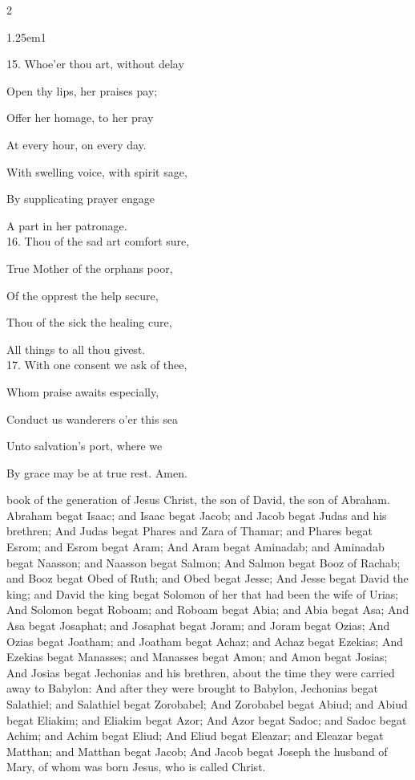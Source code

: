 \begin{multicols}{2}
\begin{hangparas}{1.25em}{1}

15. Whoe'er thou art, without delay

Open thy lips, her praises pay;

Offer her homage, to her pray

At every hour, on every day.

With swelling voice, with spirit sage,

By supplicating prayer engage

A part in her patronage.\\

16. Thou of the sad art comfort sure,

True Mother of the orphans poor,

Of the opprest the help secure,

Thou of the sick the healing cure,

All things to all thou givest.\\

17. With one consent we ask of thee,

Whom praise awaits especially,

Conduct us wanderers o'er this sea

Unto salvation's port, where we

By grace may be at true rest. Amen.
\end{hangparas}
\end{multicols}

 book of the generation of Jesus Christ, the son of David, the son of Abraham. Abraham begat Isaac; and Isaac begat Jacob; and Jacob begat Judas and his brethren; And Judas begat Phares and Zara of Thamar; and Phares begat Esrom; and Esrom begat Aram; And Aram begat Aminadab; and Aminadab begat Naasson; and Naasson begat Salmon; And Salmon begat Booz of Rachab; and Booz begat Obed of Ruth; and Obed begat Jesse; And Jesse begat David the king; and David the king begat Solomon of her that had been the wife of Urias; And Solomon begat Roboam; and Roboam begat Abia; and Abia begat Asa; And Asa begat Josaphat; and Josaphat begat Joram; and Joram begat Ozias; And Ozias begat Joatham; and Joatham begat Achaz; and Achaz begat Ezekias; And Ezekias begat Manasses; and Manasses begat Amon; and Amon begat Josias; And Josias begat Jechonias and his brethren, about the time they were carried away to Babylon: And after they were brought to Babylon, Jechonias begat Salathiel; and Salathiel begat Zorobabel; And Zorobabel begat Abiud; and Abiud begat Eliakim; and Eliakim begat Azor; And Azor begat Sadoc; and Sadoc begat Achim; and Achim begat Eliud; And Eliud begat Eleazar; and Eleazar begat Matthan; and Matthan begat Jacob; And Jacob begat Joseph the husband of Mary, of whom was born Jesus, who is called Christ.

